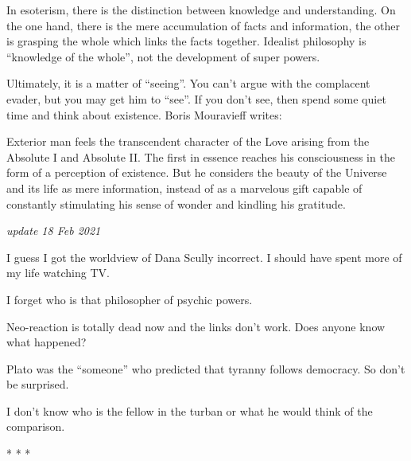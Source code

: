 In esoterism, there is the distinction between knowledge and understanding. On the one hand, there is the mere accumulation of facts and information, the other is grasping the whole which links the facts together. Idealist philosophy is ``knowledge of the whole'', not the development of super powers.

Ultimately, it is a matter of ``seeing''. You can't argue with the complacent evader, but you may get him to ``see''. If you don't see, then spend some quiet time and think about existence. Boris Mouravieff writes:

\begin{quotex}
Exterior man feels the transcendent character of the Love arising from the Absolute I and Absolute II. The first in essence reaches his consciousness in the form of a perception of existence. But he considers the beauty of the Universe and its life as mere information, instead of as a marvelous gift capable of constantly stimulating his sense of wonder and kindling his gratitude.
\end{quotex}

\textit{update 18 Feb 2021}

I guess I got the worldview of Dana Scully incorrect. I should have spent more of my life watching TV.

I forget who is that philosopher of psychic powers.

Neo-reaction is totally dead now and the links don't work. Does anyone know what happened?

Plato was the ``someone'' who predicted that tyranny follows democracy. So don't be surprised.

I don't know who is the fellow in the turban or what he would think of the comparison.



\begin{center}* * *\end{center}

